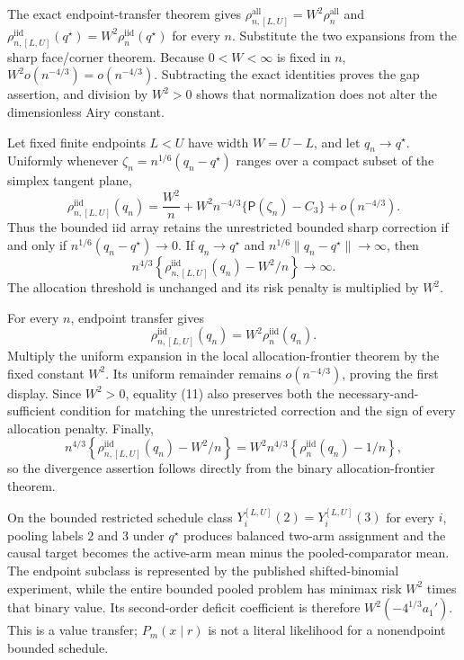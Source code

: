 The exact endpoint-transfer theorem gives
\(\rho_{n,[L,U]}^{\mathrm{all}}=W^2\rho_n^{\mathrm{all}}\) and
\(\rho_{n,[L,U]}^{\mathrm{iid}}(q^\star)=W^2\rho_n^{\mathrm{iid}}(q^\star)\) for every \(n\).  Substitute the two expansions from the sharp face/corner theorem.  Because \(0<W<\infty\) is fixed in \(n\), \(W^2o(n^{-4/3})=o(n^{-4/3})\).  Subtracting the exact identities proves the gap assertion, and division by \(W^2>0\) shows that normalization does not alter the dimensionless Airy constant.

Let fixed finite endpoints \(L<U\) have width \(W=U-L\), and let \(q_n\to q^\star\).  Uniformly whenever \(\zeta_n=n^{1/6}(q_n-q^\star)\) ranges over a compact subset of the simplex tangent plane,
\[
\rho_{n,[L,U]}^{\mathrm{iid}}(q_n)
=\frac{W^2}{n}+W^2n^{-4/3}\{\mathsf P(\zeta_n)-C_3\}
+o(n^{-4/3}).
\]
Thus the bounded iid array retains the unrestricted bounded sharp correction if and only if
\(n^{1/6}(q_n-q^\star)\to0\).  If \(q_n\to q^\star\) and
\(n^{1/6}\|q_n-q^\star\|\to\infty\), then
\[
n^{4/3}\left\{\rho_{n,[L,U]}^{\mathrm{iid}}(q_n)-W^2/n\right\}\longrightarrow\infty.
\]
The allocation threshold is unchanged and its risk penalty is multiplied by \(W^2\).

For every \(n\), endpoint transfer gives
\[
\rho_{n,[L,U]}^{\mathrm{iid}}(q_n)=W^2\rho_n^{\mathrm{iid}}(q_n).
\tag{11}
\]
Multiply the uniform expansion in the local allocation-frontier theorem by the fixed constant \(W^2\).  Its uniform remainder remains \(o(n^{-4/3})\), proving the first display.  Since \(W^2>0\), equality (11) also preserves both the necessary-and-sufficient condition for matching the unrestricted correction and the sign of every allocation penalty.  Finally,
\[
n^{4/3}\left\{\rho_{n,[L,U]}^{\mathrm{iid}}(q_n)-W^2/n\right\}
=W^2n^{4/3}\left\{\rho_n^{\mathrm{iid}}(q_n)-1/n\right\},
\]
so the divergence assertion follows directly from the binary allocation-frontier theorem.

On the bounded restricted schedule class
\(Y_i^{[L,U]}(2)=Y_i^{[L,U]}(3)\) for every \(i\), pooling labels \(2\) and \(3\) under \(q^\star\) produces balanced two-arm assignment and the causal target becomes the active-arm mean minus the pooled-comparator mean.  The endpoint subclass is represented by the published shifted-binomial experiment, while the entire bounded pooled problem has minimax risk \(W^2\) times that binary value.  Its second-order deficit coefficient is therefore \(W^2(-4^{1/3}a_1')\).  This is a value transfer; \(P_m(x\mid r)\) is not a literal likelihood for a nonendpoint bounded schedule.

